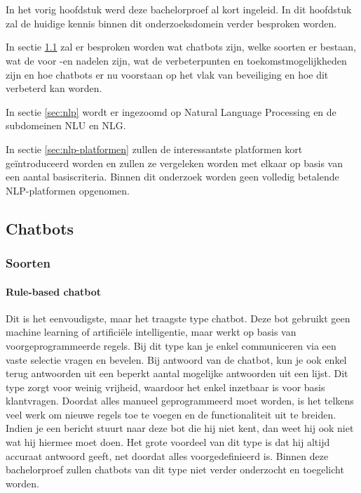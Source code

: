 \chapter{}
\label{ch:stand-van-zaken}

In het vorig hoofdstuk werd deze bachelorproef al kort ingeleid. In dit hoofdstuk zal de huidige kennis binnen dit onderzoeksdomein verder besproken worden.

In sectie \ref{sec:chatbots} zal er besproken worden wat chatbots zijn, welke soorten er bestaan, wat de voor -en nadelen zijn, wat de verbeterpunten en toekomstmogelijkheden zijn en hoe chatbots er nu voorstaan op het vlak van beveiliging en hoe dit verbeterd kan worden.

In sectie \ref{sec:nlp} wordt er ingezoomd op Natural Language Processing en de subdomeinen NLU en NLG.

In sectie \ref{sec:nlp-platformen} zullen de interessantste platformen kort geïntroduceerd worden en zullen ze vergeleken worden met elkaar op basis van een aantal basiscriteria. Binnen dit onderzoek worden geen volledig betalende NLP-platformen opgenomen.

\newpage
\section{Chatbots}
\label{sec:chatbots}

\subsection{Soorten}
\label{subsec:soorten}

\subsubsection{Rule-based chatbot}
\label{subsubsec:chatbots-soorten-rule-based-chatbot}

Dit is het eenvoudigste, maar het traagste type chatbot. Deze bot gebruikt geen machine learning of artificiële intelligentie, maar werkt op basis van voorgeprogrammeerde regels. Bij dit type kan je enkel communiceren via een vaste selectie vragen en bevelen. Bij antwoord van de chatbot, kun je ook enkel terug antwoorden uit een beperkt aantal mogelijke antwoorden uit een lijst. Dit type zorgt voor weinig vrijheid, waardoor het enkel inzetbaar is voor basis klantvragen. Doordat alles manueel geprogrammeerd moet worden, is het telkens veel werk om nieuwe regels toe te voegen en de functionaliteit uit te breiden. Indien je een bericht stuurt naar deze bot die hij niet kent, dan weet hij ook niet wat hij hiermee moet doen. Het grote voordeel van dit type is dat hij altijd accuraat antwoord geeft, net doordat alles voorgedefinieerd is. Binnen deze bachelorproef zullen chatbots van dit type niet verder onderzocht en toegelicht worden.

